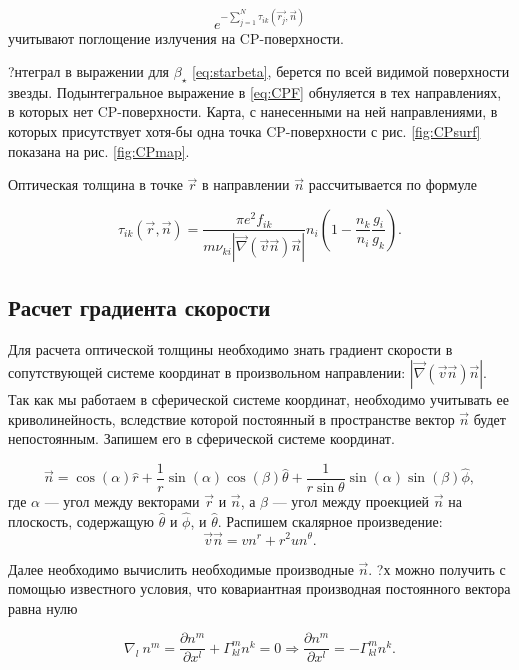 \documentclass{article}
\begin{document}
 \[e^{-\sum_{j=1}^N\tau_{ik}(\vec{r_j},\vec{n})}\]
учитывают поглощение излучения на CP-поверхности.

?нтеграл в выражении для $\beta_\star$ \eqref{eq:starbeta}, берется по всей видимой поверхности звезды. Подынтегральное выражение в \eqref{eq:CPF} обнуляется в тех направлениях, в которых нет CP-поверхности. Карта, с нанесенными на ней направлениями, в которых присутствует хотя-бы одна точка CP-поверхности с рис. \ref{fig:CPsurf} показана на рис. \ref{fig:CPmap}.  

Оптическая толщина в точке $\vec{r}$ в направлении $\vec{n}$ рассчитывается по формуле 

\begin{equation} \label{eq:optdepth}
\tau_{ik}(\vec{r},\vec{n}) = \frac{\pi e^2 f_{ik}}{m \nu_{ki} |\vec{\nabla} (\vec{v}\vec{n})\vec{n}|} n_i \left( 1 - \frac{n_k}{n_i}\frac{g_i}{g_k} \right).
\end{equation} 


\newpage

\subsection{Расчет градиента скорости}

Для расчета оптической толщины необходимо знать градиент скорости в сопутствующей системе координат в произвольном направлении: $|\vec{\nabla} (\vec{v}\vec{n})\vec{n}|$. Так как мы работаем в сферической системе координат, необходимо учитывать ее криволинейность, вследствие которой постоянный в пространстве вектор $\vec{n}$ будет непостоянным. Запишем его в сферической системе координат.

\[
\vec{n} = \cos(\alpha)\hat{r} + \frac{1}{r}\sin(\alpha)\cos(\beta)\hat{\theta} + \frac{1}{r\sin\theta}\sin(\alpha)\sin(\beta)\hat{\phi},
\] 
где $\alpha$ --- угол между векторами $\vec{r}$ и $\vec{n}$, а $\beta$ --- угол между проекцией $\vec{n}$ на плоскость, содержащую $\hat{\theta}$ и $\hat{\phi}$, и $\hat{\theta}$. Распишем скалярное произведение:
\[
\vec{v}\vec{n} = vn^r + r^2 u n^\theta.
\]

Далее необходимо вычислить необходимые производные $\vec{n}$. ?х можно получить с помощью известного условия, что ковариантная производная постоянного вектора равна нулю 

\[
\nabla_l\ n^m = \frac{\partial n^m}{\partial x^l} + \Gamma^m_{kl} n^k = 0 \Rightarrow \frac{\partial n^m}{\partial x^l} = -\Gamma^m_{kl} n^k.
\]
\end{document}
